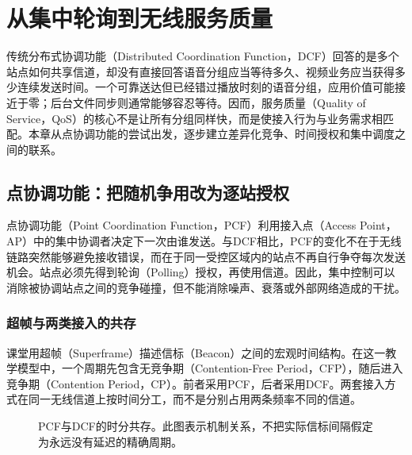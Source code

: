 \section{从集中轮询到无线服务质量}
\label{chap:qos}

传统分布式协调功能（Distributed Coordination Function，DCF）回答的是多个站点如何共享信道，却没有直接回答语音分组应当等待多久、视频业务应当获得多少连续发送时间。一个可靠送达但已经错过播放时刻的语音分组，应用价值可能接近于零；后台文件同步则通常能够容忍等待。因而，服务质量（Quality of Service，QoS）的核心不是让所有分组同样快，而是使接入行为与业务需求相匹配。本章从点协调功能的尝试出发，逐步建立差异化竞争、时间授权和集中调度之间的联系。

\subsection{点协调功能：把随机争用改为逐站授权}

点协调功能（Point Coordination Function，PCF）利用接入点（Access Point，AP）中的集中协调者决定下一次由谁发送。与DCF相比，PCF的变化不在于无线链路突然能够避免接收错误，而在于同一受控区域内的站点不再自行争夺每次发送机会。站点必须先得到轮询（Polling）授权，再使用信道。因此，集中控制可以消除被协调站点之间的竞争碰撞，但不能消除噪声、衰落或外部网络造成的干扰。

\subsubsection{超帧与两类接入的共存}

课堂用超帧（Superframe）描述信标（Beacon）之间的宏观时间结构。在这一教学模型中，一个周期先包含无竞争期（Contention-Free Period，CFP），随后进入竞争期（Contention Period，CP）。前者采用PCF，后者采用DCF。两套接入方式在同一无线信道上按时间分工，而不是分别占用两条频率不同的信道。

\begin{figure}[htbp]
\centering
{}
\caption{PCF与DCF的时分共存。此图表示机制关系，不把实际信标间隔假定为永远没有延迟的精确周期。}
\end{figure}

